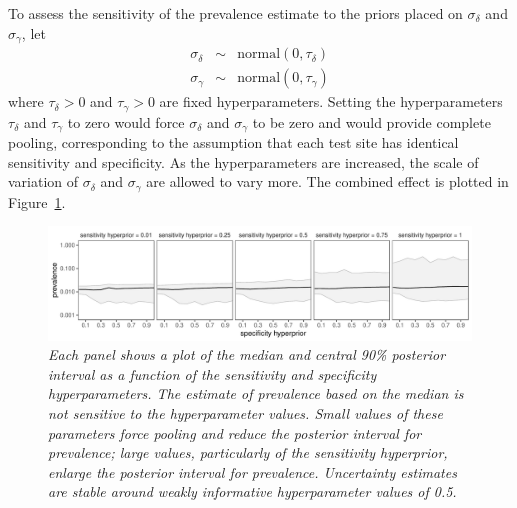 \documentclass[11pt]{article}
\begin{document}
To assess the sensitivity of the prevalence estimate to the priors
placed on $\sigma_{\delta}$ and $\sigma_{\gamma}$, let
$$
\begin{array}{rcl}
\sigma_{\delta} & \sim & \textrm{normal}(0, \tau_{\delta})
\\
\sigma_{\gamma} & \sim & \textrm{normal}(0, \tau_{\gamma})
\end{array}
$$
where $\tau_{\delta} > 0$ and $\tau_{\gamma} > 0$ are fixed
hyperparameters. Setting the hyperparameters $\tau_{\delta}$ and
$\tau_{\gamma}$ to zero would force $\sigma_{\delta}$ and
$\sigma_{\gamma}$ to be zero and would provide complete pooling,
corresponding to the assumption that each test site has identical
sensitivity and specificity. As the hyperparameters are increased, the
scale of variation of $\sigma_{\delta}$ and $\sigma_{\gamma}$ are
allowed to vary more. The combined effect is plotted in
Figure~\ref{prior-sensitivity.fig}.
%
\begin{figure}
\centerline{\includegraphics[width=\textwidth]{prior-sensitivity.pdf}}
\caption{\em Each panel shows a plot of the median and central 90\%
  posterior interval as a function of the sensitivity and
  specificity hyperparameters.  The estimate of prevalence based on
  the median is not sensitive to the hyperparameter values.  Small
  values of these parameters force  pooling and reduce the posterior
  interval for prevalence;  large values, particularly of the
  sensitivity hyperprior, enlarge the posterior interval for
  prevalence.  Uncertainty estimates are stable around weakly
  informative hyperparameter values of 0.5.}\label{prior-sensitivity.fig}
\end{figure}
\end{document}
